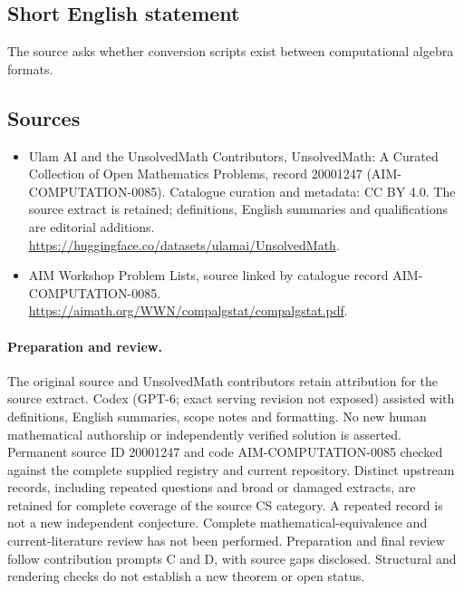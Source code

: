 \documentclass[11pt]{article}
\begin{document}
\subsection{Short English statement}
The source asks whether conversion scripts exist between computational algebra formats.
\subsection{Sources}
\begin{itemize}
\item[\hypertarget{source:20001247:1}{S1}] Ulam AI and the UnsolvedMath Contributors, UnsolvedMath: A Curated Collection of Open Mathematics Problems, record 20001247 (AIM-COMPUTATION-0085). Catalogue curation and metadata: CC BY 4.0. The source extract is retained; definitions, English summaries and qualifications are editorial additions.
\url{https://huggingface.co/datasets/ulamai/UnsolvedMath}.
\item[\hypertarget{source:20001247:2}{S2}] AIM Workshop Problem Lists, source linked by catalogue record AIM-COMPUTATION-0085.
\url{https://aimath.org/WWN/compalgstat/compalgstat.pdf}.
\end{itemize}
\paragraph{Preparation and review.}
The original source and UnsolvedMath contributors retain attribution for the source extract. Codex (GPT-6; exact serving revision not exposed) assisted with definitions, English summaries, scope notes and formatting. No new human mathematical authorship or independently verified solution is asserted. Permanent source ID 20001247 and code AIM-COMPUTATION-0085 checked against the complete supplied registry and current repository. Distinct upstream records, including repeated questions and broad or damaged extracts, are retained for complete coverage of the source CS category. A repeated record is not a new independent conjecture. Complete mathematical-equivalence and current-literature review has not been performed. Preparation and final review follow contribution prompts C and D, with source gaps disclosed. Structural and rendering checks do not establish a new theorem or open status.
\label{end:20001247}
\end{document}

